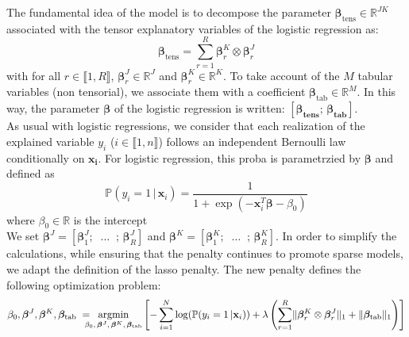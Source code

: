 \documentclass[preprint,12pt]{elsarticle}
\begin{document}
\noindent The fundamental idea of the model is to decompose the parameter $\bm{\beta}_{\text{tens}} \in \mathbb{R}^{JK}$ associated with the tensor explanatory variables of the logistic regression as:
\begin{equation}
    \bm{\beta}_{\text{tens}} = \sum\limits_{r = 1}^R\bm{\beta}_r^K \otimes \bm{\beta}_r^J
\end{equation}
with for all $r \in \llbracket 1 ,R \rrbracket$, $\bm{\beta}_r^J \in \mathbb{R}^J$ and $\bm{\beta}_r^K \in \mathbb{R}^K$. To take account of the $M$ tabular variables (non tensorial), we associate them with a coefficient $\bm{\beta}_{\text{tab}} \in \mathbb{R}^M$. In this way, the parameter $\bm{\beta}$ of the logistic regression is written: $\left[\bm{\beta_{\text{tens}}}; \, \bm{\beta_{\text{tab}}} \right]$.\\
As usual with logistic regressions, we consider that each realization of the explained variable $y_i$ ($i \in \llbracket 1, n \rrbracket$) follows an independent Bernoulli law conditionally on $\mathbf{x_i}$. For logistic regression, this proba is parametrzied by $\bm{\beta}$ and defined as
\begin{equation}
    \label{eqref:vraisemblance}
    \mathbb{P}( y_i = 1\, | \, \mathbf{x}_i) = \frac{1}{1 + \exp(- \mathbf{x}_i^T \bm{\beta} - \beta_0)}
\end{equation}
where  $\beta_0 \in \mathbb{R}$ is the intercept\\ %

\noindent We set  $\bm{\beta}^J = \left[\bm{\beta}_1^J ; \;\; \hdots \; \; ;\,\bm{\beta}_R^J \right]$ and  $\bm{\beta}^K = \left[\bm{\beta}_1^K; \; \; \hdots \; \; ;\,\bm{\beta}_R^K \right]$.
\vspace{5 pt}
\noindent In order to simplify the calculations, while ensuring that the penalty continues to promote sparse models, we adapt the definition of the lasso penalty. The new penalty defines the following optimization problem: %
\begin{equation}
    \beta_0, \bm{\beta}^J, \bm{\beta}^K, \bm{\beta}_{\text{tab}} \; = \hspace{-8pt} \underset{\beta_0 ,\, \bm{\beta}^J, \, \bm{\beta}^K, \, \bm{\beta}_{\text{tab}}}{\text{argmin}} \left[ - \sum\limits_{i = 1}^{N} \log(\mathbb{P}(y_i = 1 \, | \mathbf{x}_i)) + \lambda \left(\sum\limits_{r = 1}^R
    \lVert \bm{\beta}_r^K \otimes \bm{\beta}_r^J \rVert_1 + \lVert \bm{\beta}_{\text{tab}} \rVert_1 \right)\right]
\end{equation}
\end{document}
